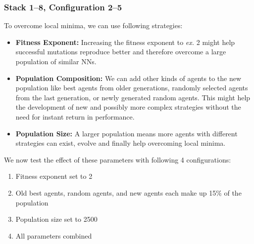 \documentclass[11pt]{report}
\begin{document}
\begin{enumerate}
    \subsubsection{Stack 1--8, Configuration 2--5}
    To overcome local minima, we can use following strategies:
    \begin{itemize}
        \item \textbf{Fitness Exponent:} Increasing the fitness exponent to \textit{ex.} 2 might help successful mutations reproduce better and therefore overcome a large population of similar NNs.
        \item \textbf{Population Composition:} We can add other kinds of agents to the new population like best agents from older generations, randomly selected agents from the last generation, or newly generated random agents.
        This might help the development of new and possibly more complex strategies without the need for instant return in performance.
        \item \textbf{Population Size:} A larger population means more agents with different strategies can exist, evolve and finally help overcoming local minima.
    \end{itemize}
    We now test the effect of these parameters with following 4 configurations:
    \begin{enumerate}
        \item Fitness exponent set to 2
        \item Old best agents, random agents, and new agents each make up 15\% of the population
        \item Population size set to 2500
        \item All parameters combined
    \end{enumerate}
    \begin{figure}[htbp!]


\end{figure}
\end{enumerate}
\end{document}
